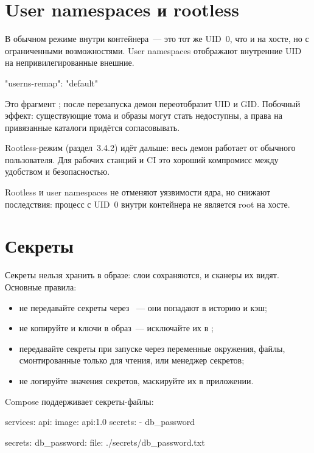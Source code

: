 \section{User namespaces и rootless}

В обычном режиме  внутри контейнера~--- это тот же UID~0,
что и на хосте, но с ограниченными возможностями. User namespaces
отображают внутренние UID на непривилегированные внешние.

\begin{code}[language=bash]
{
  "userns-remap": "default"
}
\end{code}

Это фрагмент ; после перезапуска демон
переотобразит UID и GID. Побочный эффект: существующие тома и образы
могут стать недоступны, а права на привязанные каталоги придётся
согласовывать.

Rootless-режим (раздел~3.4.2) идёт дальше: весь демон работает
от обычного пользователя. Для рабочих станций и CI это хороший
компромисс между удобством и безопасностью.

\begin{notebox}
Rootless и user namespaces не отменяют уязвимости ядра, но снижают
последствия: процесс с UID~0 внутри контейнера не является root
на хосте.
\end{notebox}

\section{Секреты}

Секреты нельзя хранить в образе: слои сохраняются, 
и сканеры их видят. Основные правила:

\begin{itemize}
  \item не передавайте секреты через ~--- они попадают
        в историю и кэш;
  \item не копируйте  и ключи в образ~--- исключайте
        их в ;
  \item передавайте секреты при запуске через переменные окружения,
        файлы, смонтированные только для чтения, или менеджер
        секретов;
  \item не логируйте значения секретов, маскируйте их в приложении.
\end{itemize}

Compose поддерживает секреты-файлы:

\begin{code}[language=composeyaml]
services:
  api:
    image: api:1.0
    secrets:
      - db_password

secrets:
  db_password:
    file: ./secrets/db_password.txt
\end{code}

